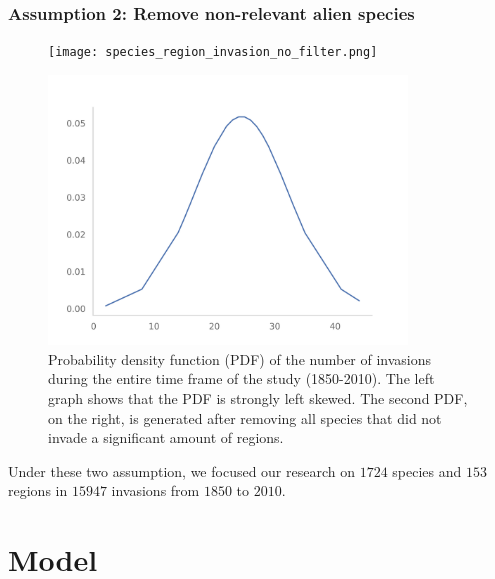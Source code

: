 \documentclass[
	11pt, %
]{beamer}
\begin{document}
\begin{frame}
\frametitle{Assumption 2: Remove non-relevant alien species}
\begin{figure}
\centering
\begin{minipage}{.5\textwidth}
  \centering
    \texttt{[image: species\_region\_invasion\_no\_filter.png]}
\end{minipage}%
\begin{minipage}{.5\textwidth}
  \centering
    \includegraphics[width=0.85\textwidth]{species_region_invasion.png}
\end{minipage}
\caption{Probability density function (PDF) of the number of invasions during the entire time frame of the study (1850-2010). The left graph shows that the PDF is strongly left skewed. The second PDF, on the right, is generated after removing all species that did not invade a significant amount of regions.}
\label{fig:pdf_invasion}
\end{figure}

\end{frame}


\begin{frame}
Under these two assumption, we focused our research on $1724$ species and $153$ regions in $15947$ invasions from $1850$ to $2010$.
\end{frame}

\section{Model}
\end{document}
